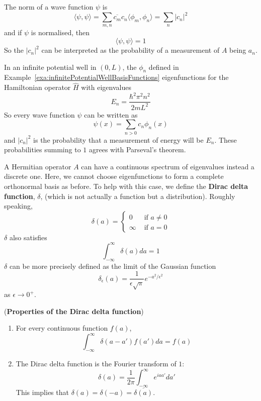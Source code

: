 \begin{corollary}
	The norm of a wave function $\psi$ is
	\[
		\langle \psi, \psi \rangle = \sum_{m, n} \overline{c_m} c_n \langle \phi_m, \phi_n \rangle = \sum_n |c_n|^2
	\]
	and if $\psi$ is normalised, then
	\[
		\langle \psi, \psi \rangle = 1
	\]
	So the $|c_n|^2$ can be interpreted as the probability of a measurement of $A$ being $a_n$.
\end{corollary}

\begin{example}
	In an infinite potential well in $(0, L)$, the $\phi_n$ defined in Example~\ref{exa:infinitePotentialWellBasisFunctions} eigenfunctions for the Hamiltonian operator $\hat{H}$ with eigenvalues
	\[
		E_n = \frac{\hbar^2 \pi^2 n^2}{2m L^2}
	\]
	So every wave function $\psi$ can be written as
	\[
		\psi(x) = \sum_{n > 0} c_n \phi_n(x)
	\]
	and $|c_n|^2$ is the probability that a measurement of energy will be $E_n$. These probabilities summing to $1$ agrees with Parseval's theorem.
\end{example}

\begin{definition}
	A Hermitian operator $A$ can have a continuous spectrum of eigenvalues instead a discrete one. Here, we cannot choose eigenfunctions to form a complete orthonormal basis as before. To help with this case, we define the \textbf{Dirac delta function}, $\delta$, (which is not actually a function but a distribution). Roughly speaking,
	\[
		\delta(a) = \begin{cases}
			0 & \text{ if } a \ne 0 \\
			\infty & \text{ if } a = 0
		\end{cases}
	\]
	$\delta$ also satisfies
	\[
		\int_{-\infty}^{\infty} \delta(a) da = 1
	\]
	$\delta$ can be more precisely defined as the limit of the Gaussian function
	\[
		\delta_{\epsilon} (a) = \frac{1}{\epsilon \sqrt{\pi}} e^{-a^2 / \epsilon^2}
	\]
	as $\epsilon \rightarrow 0^+$.
\end{definition}

\begin{proposition}
	(\textbf{Properties of the Dirac delta function})
	\begin{enumerate}
		\item For every continuous function $f(a)$,
		\[
			\int_{-\infty}^{\infty} \delta(a - a') f(a') da = f(a)
		\]
		\item The Dirac delta function is the Fourier transform of $1$:
		\[
			\delta(a) = \frac{1}{2 \pi} \int_{-\infty}^{\infty} e^{i a a'} da'
		\]
		This implies that $\delta(a) = \delta(-a) = \overline{\delta(a)}$.
	\end{enumerate}
\end{proposition}

